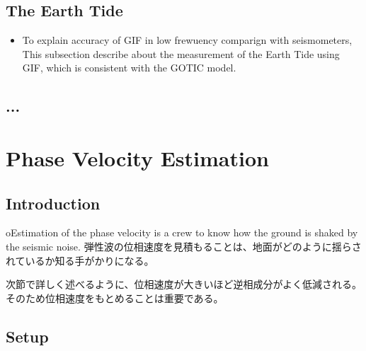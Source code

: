 \subsection{The Earth Tide}

\begin{itemize}
  \item To explain accuracy of GIF in low frewuency comparign with seismometers, This subsection describe about the measurement of the Earth Tide using GIF, which is consistent with the GOTIC model.
\end{itemize}

\subsection{...}




\section{Phase Velocity Estimation}
\subsection{Introduction}
oEstimation of the phase velocity is a crew to know how the ground is shaked by the seismic noise. 
弾性波の位相速度を見積もることは、地面がどのように揺らされているか知る手がかりになる。




次節で詳しく述べるように、位相速度が大きいほど逆相成分がよく低減される。そのため位相速度をもとめることは重要である。

\subsection{Setup}
